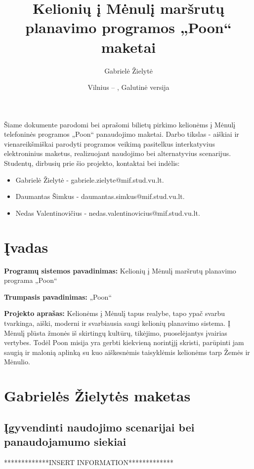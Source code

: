 \documentclass{VUMIFPSkursinis}
\title{Kelionių į Mėnulį maršrutų planavimo programos „Poon“ maketai}
\author{Gabrielė Žielytė}
\date{Vilnius – \the\year, Galutinė versija}
\begin{document}
	
\maketitle


Šiame dokumente parodomi bei aprašomi bilietų pirkimo kelionėms į Mėnulį telefoninės programos „Poon“ panaudojimo maketai. Darbo tikslas - aiškiai ir vienareikšmiškai parodyti programos veikimą pasitelkus interkatyvius elektroninius maketus, realizuojant naudojimo bei alternatyvius scenarijus. Studentų, dirbusių prie šio projekto, kontaktai bei indėlis:
\begin{itemize}
\item Gabrielė Žielytė - gabriele.zielyte@mif.stud.vu.lt. 
\item Daumantas Šimkus - daumantas.simkus@mif.stud.vu.lt. 
\item Nedas Valentinovičius - nedas.valentinovicius@mif.stud.vu.lt. 
\end{itemize}
\thispagestyle{empty}

\thispagestyle{empty}
\tableofcontents

\cleardoublepage{}
\setcounter{page}{4}

\section{Įvadas}
\textbf{Programų sistemos pavadinimas: } Kelionių į Mėnulį maršrutų planavimo programa „Poon“
\bigskip

\textbf{Trumpasis pavadinimas: } „Poon“
\bigskip




\textbf{Projekto aprašas: } Kelionėms į Mėnulį tapus realybe, tapo ypač svarbu tvarkinga, aiški, moderni ir svarbiausia saugi kelionių planavimo sistema. Į Mėnulį plūsta žmonės iš skirtingų kultūrų, tikėjimo, puoselėjantys įvairias vertybes. Todėl Poon misija yra gerbti kiekvieną norintįjį skristi, parūpinti jam saugią ir malonią aplinką su kuo aiškesnėmis taisyklėmis kelionėms tarp Žemės ir Mėnulio.

\section{Gabrielės Žielytės maketas}
\subsection{Įgyvendinti naudojimo scenarijai bei panaudojamumo siekiai}
*************INSERT INFORMATION*************
\end{document}
